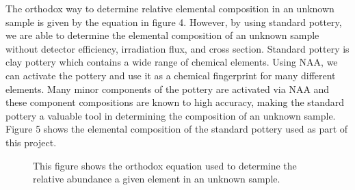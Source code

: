 \documentclass[]{article}
\begin{document}
The orthodox way to determine relative elemental composition in an unknown sample is given by the equation in figure 4. However, by using standard pottery, we are able to determine the elemental composition of an unknown sample without detector efficiency, irradiation flux, and cross section. Standard pottery is clay pottery which contains a wide range of chemical elements. Using NAA, we can activate the pottery and use it as a chemical fingerprint for many different elements. Many minor components of the pottery are activated via NAA and these component compositions are known to high accuracy, making the standard pottery a valuable tool in determining the composition of an unknown sample. Figure 5 shows the elemental composition of the standard pottery used as part of this project.

\begin{figure}[h]
\centering
{}
\caption{This figure shows the orthodox equation used to determine the relative abundance a given element in an unknown sample.}
\end{figure}
\end{document}
